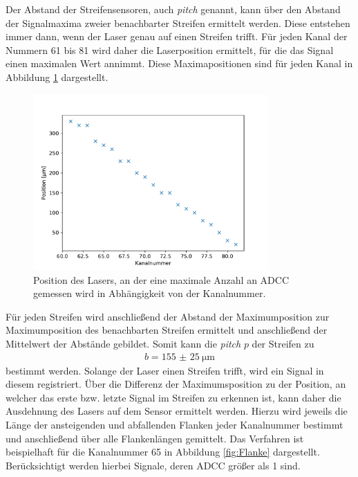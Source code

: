 Der Abstand der Streifensensoren, auch \textit{pitch} genannt, kann über den Abstand der Signalmaxima zweier benachbarter Streifen ermittelt werden. Diese entstehen immer dann, wenn der Laser genau auf einen Streifen trifft. Für jeden Kanal der Nummern 61 bis 81 wird daher die Laserposition ermittelt, für die das Signal einen maximalen Wert annimmt. Diese Maximapositionen sind für jeden Kanal in Abbildung \ref{fig:Maxima} dargestellt.
\begin{figure}
  \centering
  \includegraphics[width=0.8\textwidth]{plots/Maxima.pdf}
  \caption{Position des Lasers, an der eine maximale Anzahl an ADCC gemessen wird in Abhängigkeit von der Kanalnummer.}
  \label{fig:Maxima}
\end{figure}
\FloatBarrier
Für jeden Streifen wird anschließend der Abstand der Maximumposition zur Maximumposition des benachbarten Streifen ermittelt und anschließend der Mittelwert der Abstände gebildet.
Somit kann die \textit{pitch} $p$ der Streifen zu
\begin{align*}
  b = \SI{155(25)}{\micro\metre}
\end{align*}
bestimmt werden.
Solange der Laser einen Streifen trifft, wird ein Signal in diesem registriert. Über die Differenz der Maximumsposition zu der Position, an welcher das erste bzw. letzte Signal im Streifen zu erkennen ist, kann daher die Ausdehnung des Lasers auf dem Sensor ermittelt werden. Hierzu wird jeweils die Länge der ansteigenden und abfallenden Flanken jeder Kanalnummer bestimmt und anschließend über alle Flankenlängen gemittelt. Das Verfahren ist beispielhaft für die Kanalnummer 65 in Abbildung \ref{fig:Flanke} dargestellt. Berücksichtigt werden hierbei Signale, deren ADCC größer als 1 sind. 
